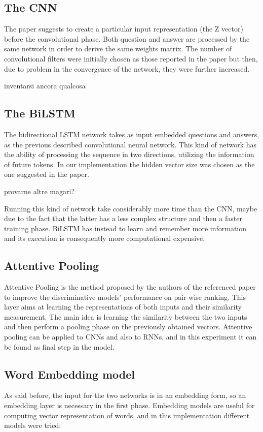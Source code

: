 \documentclass[11pt,a4paper]{article}
\begin{document}
\subsection{The CNN}
The paper suggests to create a particular input representation (the Z vector) before the convolutional phase. Both question and answer are processed by the same network in order to derive the same weights matrix. The number of convolutional filters were initially chosen as those reported in the paper but then, due to problem in the convergence of the network, they were further increased.

inventarsi ancora qualcosa

\subsection{The BiLSTM}
The bidirectional LSTM network takes as input embedded questions and answers, as the previous described convolutional neural network. This kind of network has the ability of processing the sequence in two directions, utilizing the information of future tokens. In our implementation the hidden vector size was chosen as the one suggested in the paper. 

provarne altre magari?

Running this kind of network take considerably more time than the CNN, maybe due to the fact that the latter has a less complex structure and then a faster training phase. BiLSTM has instead to learn and remember more information and its execution is consequently more computational expensive.

\subsection{Attentive Pooling}
Attentive Pooling is the method proposed by the authors of the referenced paper to improve the discriminative models' performance on pair-wise ranking. This layer aims at learning the representations of both inputs and their similarity measurement. The main idea is learning the similarity between the two inputs and then perform a pooling phase on the previously obtained vectors. 
Attentive pooling can be applied to CNNs and also to RNNs, and in this experiment it can be found as final step in the model.

\subsection{Word Embedding model}
As said before, the input for the two networks is in an embedding form, so an embedding layer is necessary in the first phase. Embedding models are useful for computing vector representation of words, and in this implementation different models were tried:
\end{document}
